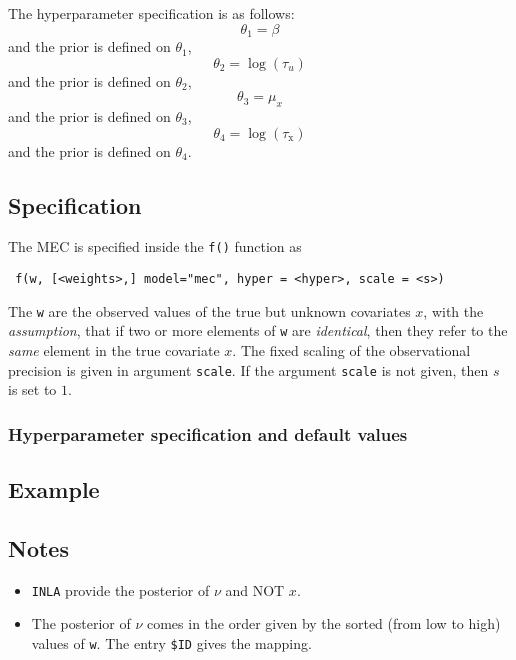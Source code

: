 \documentclass[a4paper,11pt]{article}
\begin{document}
The hyperparameter specification is as follows:
\begin{displaymath}
    \theta_{1} = \beta
\end{displaymath}
and the prior is defined on $\theta_{1}$,
\begin{displaymath}
    \theta_{2} = \log(\tau_u)
\end{displaymath}
and the prior is defined on $\theta_{2}$,
\begin{displaymath}
    \theta_{3} = \mu_{x}
\end{displaymath}
and the prior is defined on $\theta_{3}$,
\begin{displaymath}
    \theta_{4} = \log(\tau_{\text{x}})
\end{displaymath}
and the prior is defined on $\theta_{4}$.


\subsection*{Specification}

The MEC is specified inside the {\tt f()}
function as
\begin{verbatim}
 f(w, [<weights>,] model="mec", hyper = <hyper>, scale = <s>)
\end{verbatim}

The \texttt{w} are the observed values of the true but unknown covariates
$x$, with the \emph{assumption}, that if two or more elements of
\texttt{w} are \emph{identical}, then they refer to the
\emph{same} element in the true covariate $x$. The fixed scaling of
the observational precision is given in argument \texttt{scale}. If
the argument \texttt{scale} is not given, then $s$ is set to $1$.


\subsubsection*{Hyperparameter specification and default values}


\subsection*{Example}



\subsection*{Notes}

\begin{itemize}
\item \texttt{INLA} provide the posterior of $\nu$ and NOT $x$.
\item The posterior of $\nu$ comes in the order given by the sorted
    (from low to high) values of \texttt{w}. The entry \verb|$ID|
    gives the mapping.
\end{itemize}
\end{document}
